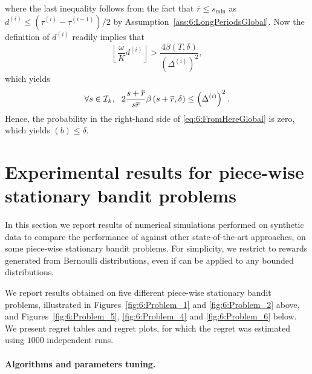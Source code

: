 %
where the last inequality follows from the fact that $\overline{r} \leq s_{\min}$ as $d^{(i)} \leq (\tau^{(i)} - \tau^{(i-1)})/2$ by Assumption~\ref{ass:6:LongPeriodsGlobal}. Now the definition of $d^{(i)}$ readily implies that
\[\left\lfloor \frac{\omega}{K}d^{(i)}\right\rfloor > \frac{4\beta(T,\delta)}{\left(\Delta^{(i)}\right)^2},\]
which yields
\[\forall s \in \cI_k, \ \ 2\frac{s+\overline{r}}{s\overline{r}}\beta\left(s+\overline{r}, \delta\right) \leq \left(\Delta^{(i)}\right)^2.\]
%
Hence, the probability in the right-hand side of \eqref{eq:6:FromHereGlobal} is zero, which yields $(b) \leq \delta$.





\section{Experimental results for piece-wise stationary bandit problems}
\label{sec:6:NumericalExperiments}

In this section we report results of numerical simulations performed on synthetic data to compare the performance of \GLRklUCB{} against other state-of-the-art approaches, on some piece-wise stationary bandit problems.
%
For simplicity, we restrict to rewards generated from Bernoulli distributions, even if \GLRklUCB{} can be applied to any bounded distributions.


We report results obtained on five different piece-wise stationary bandit problems, illustrated in Figures~\ref{fig:6:Problem_1} and \ref{fig:6:Problem_2} above, and Figures~\ref{fig:6:Problem_5}, \ref{fig:6:Problem_4} and \ref{fig:6:Problem_6} below.
We present regret tables and regret plots,
for which the regret was estimated using $1000$ independent runs.


\paragraph{Algorithms and parameters tuning.}
\label{sub:6:ParametersTuning}

